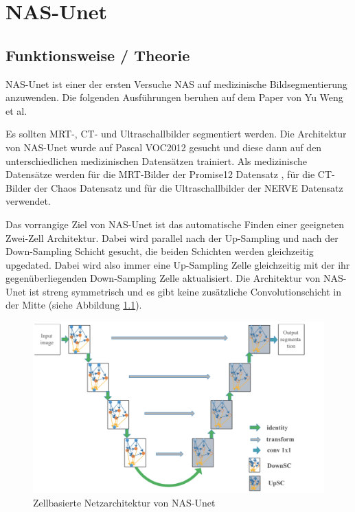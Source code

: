 \chapter{NAS-Unet}
\label{ch:nasunet}



\section{Funktionsweise / Theorie}

NAS-Unet ist einer der ersten Versuche NAS auf medizinische Bildsegmentierung anzuwenden. Die folgenden Ausführungen beruhen auf dem Paper \cite{nasunetPaper} von Yu Weng et al.

Es sollten MRT-, CT- und Ultraschallbilder segmentiert werden. Die Architektur von NAS-Unet wurde auf Pascal VOC2012 \cite{PascalVOCDatensatz} gesucht und diese dann auf den unterschiedlichen medizinischen Datensätzen trainiert. Als medizinische Datensätze werden für die MRT-Bilder der Promise12 Datensatz \cite{Promise12Datensatz}, für die CT-Bilder der Chaos Datensatz \cite{ChaosDatensatz} und für die Ultraschallbilder der NERVE Datensatz \cite{NerveDatensatz} verwendet. 

Das vorrangige Ziel von NAS-Unet ist das automatische Finden einer geeigneten Zwei-Zell Architektur. Dabei wird parallel nach der Up-Sampling und nach der Down-Sampling Schicht gesucht, die beiden Schichten werden gleichzeitig upgedated. Dabei wird also immer eine Up-Sampling Zelle gleichzeitig mit der ihr gegenüberliegenden Down-Sampling Zelle aktualisiert. Die Architektur von NAS-Unet ist streng symmetrisch und es gibt keine zusätzliche Convolutionschicht in der Mitte (siehe Abbildung \ref{pic:nasUnet_ArchitekturGesamt}). 

\begin{figure}[H]
	
	\centering
	\includegraphics[scale=0.25]{Pictures/nasUnet/Bild1.png}
	\caption{Zellbasierte Netzarchitektur von NAS-Unet \cite{nasunetPaper} }
	\label{pic:nasUnet_ArchitekturGesamt}
\end{figure}

